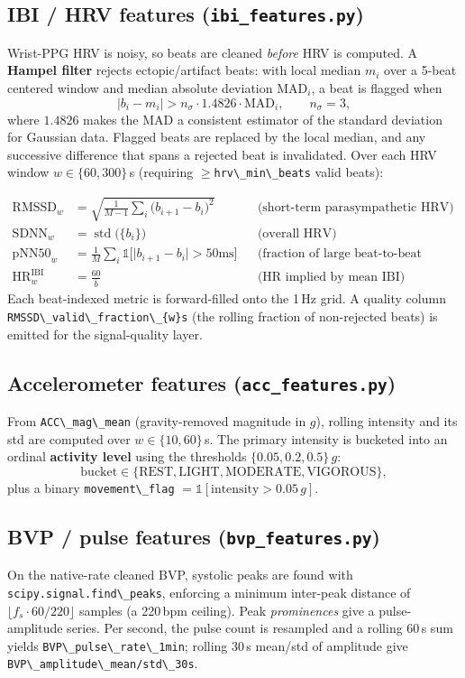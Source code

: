 \documentclass[11pt,a4paper]{article}
\newcommand{\code}[1]{\lstinline[basicstyle=\ttfamily\normalsize]!#1!}
\begin{document}
\subsection{IBI / HRV features (\texttt{ibi\_features.py})}
Wrist-PPG HRV is noisy, so beats are cleaned \emph{before} HRV is computed. A
\textbf{Hampel filter} rejects ectopic/artifact beats: with local median $m_i$
over a 5-beat centered window and median absolute deviation $\text{MAD}_i$, a
beat is flagged when
\[
\lvert b_i - m_i\rvert > n_\sigma \cdot 1.4826\cdot \text{MAD}_i,\qquad n_\sigma=3,
\]
where $1.4826$ makes the MAD a consistent estimator of the standard deviation
for Gaussian data. Flagged beats are replaced by the local median, and any
successive difference that spans a rejected beat is invalidated. Over each HRV
window $w\in\{60,300\}$\,s (requiring $\geq$\code{hrv\_min\_beats} valid beats):

\begin{align*}
\text{RMSSD}_w &= \sqrt{\tfrac{1}{M-1}\textstyle\sum_i \big(b_{i+1}-b_i\big)^2}
   &&\text{(short-term parasympathetic HRV)}\\
\text{SDNN}_w &= \operatorname{std}\big(\{b_i\}\big)
   &&\text{(overall HRV)}\\
\text{pNN50}_w &= \frac{1}{M}\sum_i \mathbb{1}\big[\lvert b_{i+1}-b_i\rvert > 50\text{ms}\big]
   &&\text{(fraction of large beat-to-beat jumps)}\\
\text{HR}^{\text{IBI}}_w &= \frac{60}{\overline{b}}
   &&\text{(HR implied by mean IBI)}
\end{align*}
Each beat-indexed metric is forward-filled onto the 1\,Hz grid. A quality column
\code{RMSSD\_valid\_fraction\_{w}s} (the rolling fraction of non-rejected beats)
is emitted for the signal-quality layer.

\subsection{Accelerometer features (\texttt{acc\_features.py})}
From \code{ACC\_mag\_mean} (gravity-removed magnitude in $g$), rolling intensity
and its std are computed over $w\in\{10,60\}$\,s. The primary intensity is
bucketed into an ordinal \textbf{activity level} using the thresholds
$\{0.05, 0.2, 0.5\}\,g$:
\[
\text{bucket} \in \{\text{REST}, \text{LIGHT}, \text{MODERATE}, \text{VIGOROUS}\},
\]
plus a binary \code{movement\_flag} $=\mathbb{1}[\text{intensity}>0.05\,g]$.

\subsection{BVP / pulse features (\texttt{bvp\_features.py})}
On the native-rate cleaned BVP, systolic peaks are found with
\code{scipy.signal.find\_peaks}, enforcing a minimum inter-peak distance of
$\lfloor f_s\cdot 60/220\rfloor$ samples (a 220\,bpm ceiling). Peak
\emph{prominences} give a pulse-amplitude series. Per second, the pulse count is
resampled and a rolling 60\,s sum yields \code{BVP\_pulse\_rate\_1min}; rolling
30\,s mean/std of amplitude give \code{BVP\_amplitude\_mean/std\_30s}.
\end{document}
